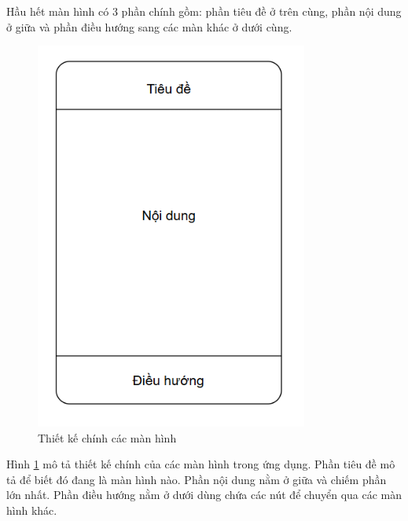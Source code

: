 \documentclass[../DoAn.tex]{subfiles}
\begin{document}
Hầu hết màn hình có 3 phần chính gồm: phần tiêu đề ở trên cùng, phần nội dung ở giữa và phần điều hướng sang các màn khác ở dưới cùng.

\begin{figure}[H]
    \centering
    \includegraphics[width=0.8\textwidth]{Hinhve/Thiet_ke_man_hinh_chinh.png}
    \caption{Thiết kế chính các màn hình}
    \label{fig:Thiet_ke_chinh_ung_dung}
\end{figure}

Hình \ref{fig:Thiet_ke_chinh_ung_dung} mô tả thiết kế chính của các màn hình 
trong ứng dụng. Phần tiêu đề mô tả để biết đó đang là màn hình nào. 
Phần nội dung nằm ở giữa và chiếm phần lớn nhất. Phần điều hướng nằm ở dưới dùng chứa các nút 
để chuyển qua các màn hình khác.
\end{document}
